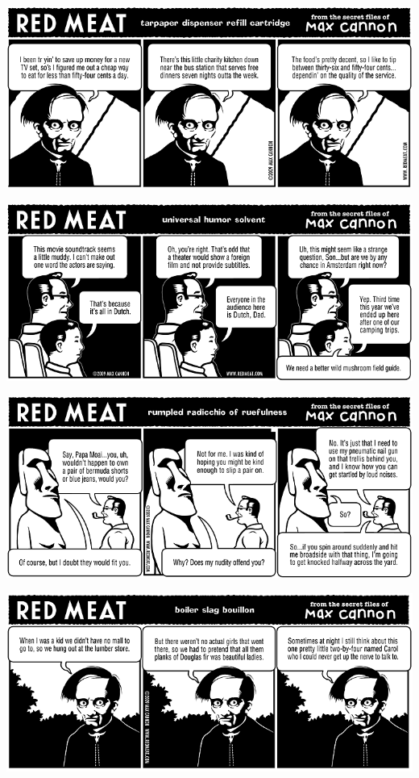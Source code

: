 \documentclass[a4paper,twoside,11pt]{article}
\begin{document}
\includegraphics[width=\textwidth]{redmeat_2009-04-07.png}



\includegraphics[width=\textwidth]{redmeat_2009-04-14.png}



\includegraphics[width=\textwidth]{redmeat_2009-04-21.png}



\includegraphics[width=\textwidth]{redmeat_2009-04-28.png}
\end{document}
